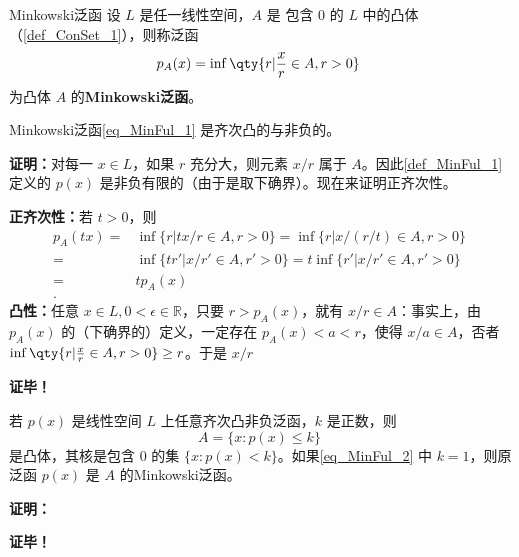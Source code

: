 

\begin{definition}{Minkowski泛函}\label{def_MinFul_1}
设 $L$ 是任一线性空间，$A$ 是 包含 0 的 $L$ 中的凸体（\autoref{def_ConSet_1}），则称泛函
\begin{equation}\label{eq_MinFul_1}
p_A(x)=\inf\qty{r|\frac{x}{r}\in A,r>0}~
\end{equation}
为凸体 $A$ 的\textbf{Minkowski泛函}。

\end{definition}


\begin{theorem}{}
Minkowski泛函\autoref{eq_MinFul_1} 是齐次凸的与非负的。
\end{theorem}

\textbf{证明：}对每一 $x\in L$，如果 $r$ 充分大，则元素 $x/r$ 属于 $A$。因此\autoref{def_MinFul_1} 定义的 $p(x)$ 是非负有限的（由于是取下确界）。现在来证明正齐次性。

\textbf{正齐次性：}若 $t>0$，则
\begin{equation}
\begin{aligned}
p_A(tx)=&\inf \{r|tx/r\in A,r>0\}=\inf \{r|x/(r/t)\in A,r>0\}\\
=&\inf \{tr'|x/r'\in A,r'>0\}=t\inf \{r'|x/r'\in A,r'>0\}\\
=&tp_A(x)\\.
\end{aligned}~
\end{equation}
\textbf{凸性：}任意 $x\in L,0<\epsilon\in\mathbb R$，只要 $r>p_A(x)$，就有 $x/r\in A$：事实上，由 $p_A(x)$ 的（下确界的）定义，一定存在 $p_A(x)< a<r$，使得 $x/a\in A$，否者$\inf\qty{r|\frac{x}{r}\in A,r>0}\geq r$。于是 $x/r$ 




\textbf{证毕！}

\begin{theorem}{}
若 $p(x)$ 是线性空间 $L$ 上任意齐次凸非负泛函，$k$ 是正数，则
\begin{equation}\label{eq_MinFul_2}
A=\{x:p(x)\leq k\}~
\end{equation}
是凸体，其核是包含 $0$ 的集 $\{x:p(x)<k\}$。如果\autoref{eq_MinFul_2} 中 $k=1$，则原泛函 $p(x)$ 是 $A$ 的Minkowski泛函。
\end{theorem}

\textbf{证明：}




\textbf{证毕！}
